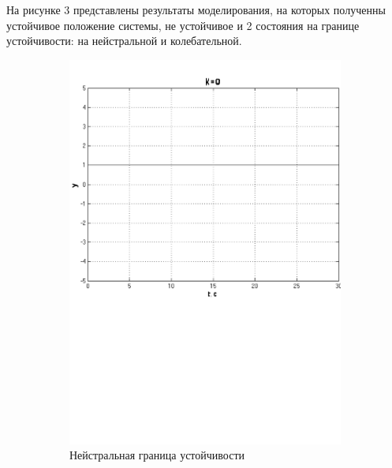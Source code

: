 \documentclass[a4paper, 11pt, russian]{article}
\begin{document}
    На рисунке 3 представлены результаты моделирования, на которых полученны устойчивое положение системы, не устойчивое и 2 состояния на границе устойчивости: на нейстральной и колебательной.
    \begin{figure}[ht!]
        \begin{subfigure}[b]{0.49\textwidth}
            \includegraphics[width = \textwidth]{neutralStabilityLimit}
            \centering
            \caption{Нейстральная граница устойчивости}
        \end{subfigure}
        \hfill
        \begin{subfigure}[b]{0.49\textwidth}

\end{subfigure}
\end{figure}
\end{document}
